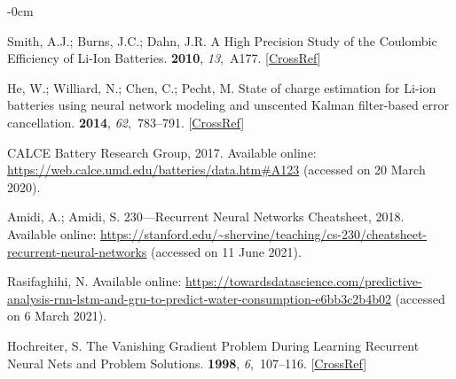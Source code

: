 \documentclass[energies,article,accept,pdftex,moreauthors]{Definitions/mdpi}
\begin{document}
\begin{adjustwidth}{-\extralength}{0cm}
\begin{thebibliography}{999}
    Smith, A.J.; Burns, J.C.; Dahn, J.R.
    \newblock A High Precision Study of the Coulombic Efficiency of Li-Ion
    Batteries.
     {\bf 2010}, {\em
    13},~A177. [\href{http://dx.doi.org/10.1149/1.3487637}{CrossRef}]
    
    He, W.; Williard, N.; Chen, C.; Pecht, M.
    \newblock State of charge estimation for {Li}-ion batteries using neural
    network modeling and unscented {Kalman} filter-based error cancellation.
    {\bf 2014}, {\em 62},~783--791. [\href{http://dx.doi.org/10.1016/j.ijepes.2014.04.059}{CrossRef}]
    
    CALCE Battery Research Group, 2017.
    \newblock Available online: \url{https://web.calce.umd.edu/batteries/data.htm#A123}
    \newblock (accessed on 20 March 2020).
    
    Amidi, A.; Amidi, S.
     230---{Recurrent} {Neural} {Networks} {Cheatsheet}, 2018.
    \newblock Available online: \url{https://stanford.edu/~shervine/teaching/cs-230/cheatsheet-recurrent-neural-networks}
    \newblock (accessed on 11 June  2021).
    
    Rasifaghihi, N.
    \newblock Available online: \url{https://towardsdatascience.com/predictive-analysis-rnn-lstm-and-gru-to-predict-water-consumption-e6bb3c2b4b02}
    \newblock (accessed on 6 March 2021).
    
    Hochreiter, S.
    \newblock The {Vanishing} {Gradient} {Problem} {During} {Learning} {Recurrent}
    {Neural} {Nets} and {Problem} {Solutions}.
     {\bf 1998}, {\em 6},~107--116. [\href{http://dx.doi.org/10.1142/S0218488598000094}{CrossRef}]
    

\end{thebibliography}
\end{adjustwidth}
\end{document}
